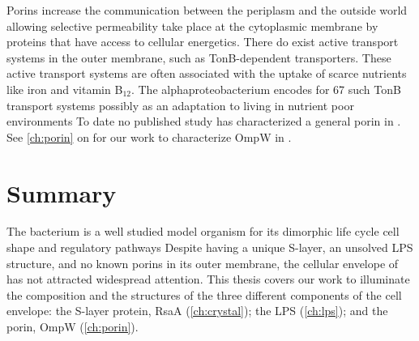 Porins increase the communication between the periplasm and the outside world allowing selective permeability take place at the cytoplasmic membrane by proteins that have access to
cellular energetics. There do exist active transport systems in the outer membrane, such as TonB-dependent transporters. These active transport systems are often associated with
the uptake of scarce nutrients like iron and vitamin B$_{12}$. The alphaproteobacterium \caulobacter{} encodes for 67 such TonB transport systems
possibly as an adaptation to living in nutrient poor environments To date no published study has characterized a general porin in \caulobacter{}. See
\cref{ch:porin} on  for our work to characterize OmpW in \caulobacter{}.

 \section{Summary}\label{sec:summary} The bacterium \caulobacter is a well studied model organism for its dimorphic life cycle cell
shape and regulatory pathways Despite having a unique \ac{S-layer}, an unsolved \ac{LPS} structure, and no known porins in
its outer membrane, the cellular envelope of \caulobacter has not attracted
widespread attention. This thesis covers our work to illuminate the composition and the structures of the
three different components of the \caulobacter cell envelope: the \ac{S-layer} protein, RsaA (\cref{ch:crystal}); the \ac{LPS} (\cref{ch:lps}); and the porin, OmpW
(\cref{ch:porin}).



